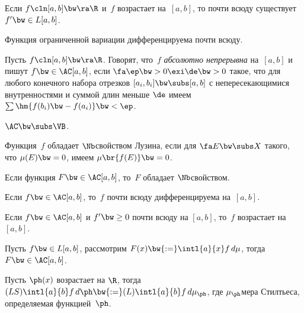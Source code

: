 \documentclass[a4paper]{article}
\begin{document}
\begin{theorem}
  Если $f\cln [a,b]\bw\ra \R$ и~$f$ возрастает на~$[a,b]$, то почти всюду
  существует $f' \bw\in L[a,b]$.
\end{theorem}

\begin{imp}
  Функция ограниченной вариации дифференцируема почти всюду.
\end{imp}

\begin{df}
  Пусть $f\cln [a,b]\bw\ra \R$. Говорят, что~$f$ \emph{абсолютно непрерывна} на~$[a,b]$ и
  пишут $f \bw\in \AC[a,b]$, если $\fa\ep \bw> 0 \exi\de \bw> 0$ такое, что для любого
  конечного набора отрезков $[a_i,b_i] \bw\subs [a,b]$ с непересекающимися внутренностями
  и суммой длин меньше $\de$ имеем $\sum\hm{f(b_i) \bw- f(a_i)} \bw< \ep$.
\end{df}

\begin{theorem}
  $\AC \bw\subs \VB$.
\end{theorem}

\begin{df}
  Функция~$f$ обладает $\Nb$\д свойством Лузина, если для $\fa E \bw\subs X$ такого, что
  $\mu(E) \bw= 0$, имеем $\mu\br{f(E)} \bw= 0$.
\end{df}

\begin{theorem}
  Если функция $F \bw\in \AC[a,b]$, то~$F$ обладает $\Nb$\д свойством.
\end{theorem}

\begin{note}
  Если $f \bw\in \AC[a,b]$, то~$f$ почти всюду дифференцируема на~$[a,b]$.
\end{note}

\begin{theorem}
  Если $f \bw\in \AC[a,b]$ и $f' \bw\ge 0$ почти всюду на $[a,b]$, то~$f$ возрастает на~$[a,b]$.
\end{theorem}

\begin{theorem}
  Пусть $f \bw\in L[a,b]$, рассмотрим $F(x) \bw{:=} \intl{a}{x} f\,d\mu$, тогда $F \bw\in \AC[a,b]$.
\end{theorem}

\begin{df}
  Пусть $\ph(x)$ возрастает на $\R$, тогда $(LS) \intl{a}{b} f\,d\ph \bw{:=}
  (L)\intl{a}{b} f\,d\mu_\ph$, где $\mu_\ph$\т мера Стилтьеса,
  определяемая функцией~$\ph$.
\end{df}
\end{document}
